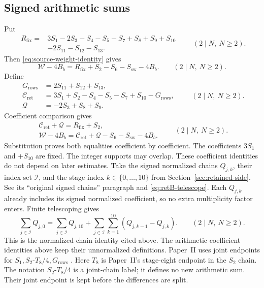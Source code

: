\subsection{Signed arithmetic sums}

Put
\begin{equation}\label{eq:source-fixed-sum}
\begin{aligned}
 R_{\mathrm{fix}}={}&3S_1-2S_3-S_4-S_5-S_7+S_8+S_9+S_{10}\\
 &-2S_{11}-S_{12}-S_{13}.
\end{aligned}
\qquad(2\mid N,\ N\ge2).
\end{equation}
Then \eqref{eq:source-weight-identity} gives
\begin{equation}\label{eq:source-finite-identity}
 \mathcal W-4B_b
 =R_{\mathrm{fix}}+S_2-S_6-S_{\mathrm{sw}}-4B_b.
\qquad(2\mid N,\ N\ge2).
\end{equation}
Define
\begin{equation}\label{eq:source-retained-definitions}
\begin{aligned}
 G_{\mathrm{rows}}&=2S_{11}+S_{12}+S_{13},\\
 \mathcal C_{\mathrm{ret}}&=3S_1+S_2-S_4-S_5-S_7+S_{10}-G_{\mathrm{rows}},\\
 \mathcal Q&=-2S_3+S_8+S_9.
\end{aligned}
\qquad(2\mid N,\ N\ge2).
\end{equation}
Coefficient comparison gives
\begin{equation}\label{eq:source-five-sums}
\begin{gathered}
 \mathcal C_{\mathrm{ret}}+\mathcal Q=R_{\mathrm{fix}}+S_2,\\
 \mathcal W-4B_b
 =\mathcal C_{\mathrm{ret}}+\mathcal Q-S_6-S_{\mathrm{sw}}-4B_b.
\end{gathered}
\qquad(2\mid N,\ N\ge2).
\end{equation}
Substitution proves both equalities coefficient by coefficient.
The coefficients \(3S_1\) and \(+S_{10}\) are fixed.
The integer supports may overlap.
These coefficient identities do not depend on later estimates.
Take the signed normalized chains \(Q_{j,k}\), their index set
\(\mathcal I\), and the stage index \(k\in\{0,\ldots,10\}\) from
Section~\ref{sec:retained-side}. See its ``original signed chains'' paragraph
and \eqref{eq:retB-telescope}. Each \(Q_{j,k}\) already includes its
signed normalized coefficient, so no extra multiplicity factor enters.
Finite telescoping gives
\begin{equation}\label{eq:source-signed-telescope}
 \sum_{j\in\mathcal I}Q_{j,0}
 =\sum_{j\in\mathcal I}Q_{j,10}
  +\sum_{j\in\mathcal I}\sum_{k=1}^{10}(Q_{j,k-1}-Q_{j,k}).
\qquad(2\mid N,\ N\ge2).
\end{equation}
This is the normalized-chain identity cited above. The arithmetic coefficient
identities above keep their unnormalized definitions.
Paper~II uses joint endpoints for
\(S_1,S_2\text{-}T_8/4,G_{\mathrm{rows}}\)
\cite[(6.4)--(6.4d), pp.~70--72]{PaperII}.
Here \(T_8\) is Paper~II's stage-eight endpoint in the \(S_2\) chain.
The notation \(S_2\text{-}T_8/4\) is a joint-chain label;
it defines no new arithmetic sum.
Their joint endpoint is kept before the differences are split.


